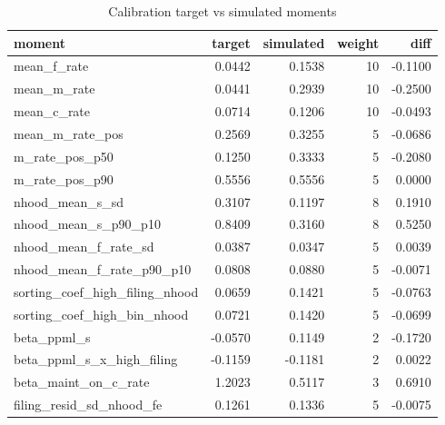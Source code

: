 \begin{table}

\caption{Calibration target vs simulated moments}
\centering
\begin{tabular}[t]{lrrrr}
\toprule
moment & target & simulated & weight & diff\\
\midrule
mean\_f\_rate & 0.0442 & 0.1538 & 10 & -0.1100\\
mean\_m\_rate & 0.0441 & 0.2939 & 10 & -0.2500\\
mean\_c\_rate & 0.0714 & 0.1206 & 10 & -0.0493\\
mean\_m\_rate\_pos & 0.2569 & 0.3255 & 5 & -0.0686\\
m\_rate\_pos\_p50 & 0.1250 & 0.3333 & 5 & -0.2080\\
m\_rate\_pos\_p90 & 0.5556 & 0.5556 & 5 & 0.0000\\
nhood\_mean\_s\_sd & 0.3107 & 0.1197 & 8 & 0.1910\\
nhood\_mean\_s\_p90\_p10 & 0.8409 & 0.3160 & 8 & 0.5250\\
nhood\_mean\_f\_rate\_sd & 0.0387 & 0.0347 & 5 & 0.0039\\
nhood\_mean\_f\_rate\_p90\_p10 & 0.0808 & 0.0880 & 5 & -0.0071\\
sorting\_coef\_high\_filing\_nhood & 0.0659 & 0.1421 & 5 & -0.0763\\
sorting\_coef\_high\_bin\_nhood & 0.0721 & 0.1420 & 5 & -0.0699\\
beta\_ppml\_s & -0.0570 & 0.1149 & 2 & -0.1720\\
beta\_ppml\_s\_x\_high\_filing & -0.1159 & -0.1181 & 2 & 0.0022\\
beta\_maint\_on\_c\_rate & 1.2023 & 0.5117 & 3 & 0.6910\\
filing\_resid\_sd\_nhood\_fe & 0.1261 & 0.1336 & 5 & -0.0075\\
\bottomrule
\end{tabular}
\end{table}
